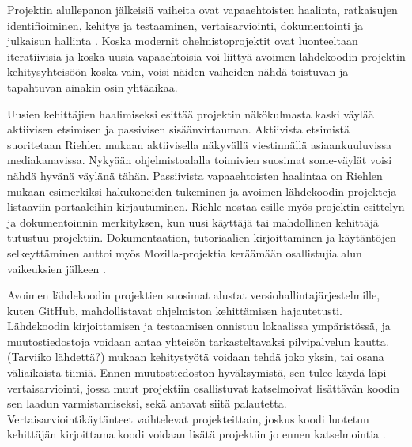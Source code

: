\documentclass[utf8]{gradu3}
\begin{document}
Projektin alullepanon jälkeisiä vaiheita ovat vapaaehtoisten haalinta,
ratkaisujen identifioiminen, kehitys ja testaaminen, vertaisarviointi,
dokumentointi ja julkaisun hallinta \parencite{Sharma-2002}. Koska modernit
ohelmistoprojektit ovat luonteeltaan iteratiivisia ja koska uusia vapaaehtoisia
voi liittyä avoimen lähdekoodin projektin kehitysyhteisöön koska vain, voisi
näiden vaiheiden nähdä toistuvan ja tapahtuvan ainakin osin yhtäaikaa.

Uusien kehittäjien haalimiseksi \textcite{Riehle-2015} esittää projektin
näkökulmasta kaski väylää aktiivisen etsimisen ja passivisen sisäänvirtauman.
Aktiivista etsimistä suoritetaan Riehlen mukaan aktiivisella näkyvällä
viestinnällä asiaankuuluvissa mediakanavissa. Nykyään ohjelmistoalalla toimivien
suosimat some-väylät voisi nähdä hyvänä väylänä tähän. Passiivista
vapaaehtoisten haalintaa on Riehlen mukaan esimerkiksi hakukoneiden tukeminen ja
avoimen lähdekoodin projekteja listaaviin portaaleihin kirjautuminen. Riehle
nostaa esille myös projektin esittelyn ja dokumentoinnin merkityksen, kun uusi
käyttäjä tai mahdollinen kehittäjä tutustuu projektiin. Dokumentaation,
tutoriaalien kirjoittaminen ja käytäntöjen selkeyttäminen auttoi myös
Mozilla-projektia keräämään osallistujia alun vaikeuksien jälkeen
\parencite{Mockus-2002}.

Avoimen lähdekoodin projektien suosimat alustat versiohallintajärjestelmille,
kuten GitHub, mahdollistavat ohjelmiston kehittämisen hajautetusti. Lähdekoodin
kirjoittamisen ja testaamisen onnistuu lokaalissa ympäristössä, ja
muutostiedostoja voidaan antaa yhteisön tarkasteltavaksi pilvipalvelun kautta.
(Tarviiko lähdettä?) \textcite{Sharma-2002} mukaan kehitystyötä voidaan tehdä
joko yksin, tai osana väliaikaista tiimiä. Ennen muutostiedoston hyväksymistä,
sen tulee käydä läpi vertaisarviointi, jossa muut projektiin osallistuvat
katselmoivat lisättävän koodin sen laadun varmistamiseksi, sekä antavat siitä
palautetta. Vertaisarviointikäytänteet vaihtelevat projekteittain, joskus koodi
luotetun kehittäjän kirjoittama koodi voidaan lisätä projektiin jo ennen
katselmointia \parencite{Wang-2015,Rigby-2008}.

\end{document}
